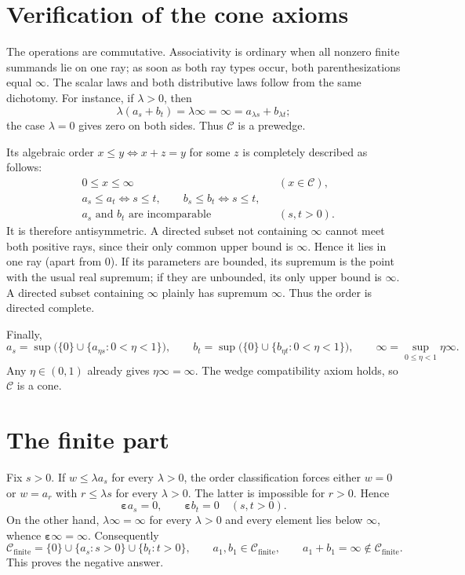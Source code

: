 \documentclass[11pt]{article}
\newcommand{\C}{\mathcal C}
\newcommand{\Fin}{\mathcal C_{\mathrm{finite}}}
\newcommand{\epsp}{\boldsymbol\varepsilon}
\newcommand{\topel}{\boldsymbol\infty}
\begin{document}
\section{Verification of the cone axioms}

The operations are commutative.  Associativity is ordinary when all
nonzero finite summands lie on one ray; as soon as both ray types occur,
both parenthesizations equal $\topel$.  The scalar laws and both
distributive laws follow from the same dichotomy.  For instance, if
$\lambda>0$, then
\[
 \lambda(a_s+b_t)=\lambda\topel=\topel
 =a_{\lambda s}+b_{\lambda t};
\]
the case $\lambda=0$ gives zero on both sides.  Thus $\C$ is a prewedge.

Its algebraic order $x\leq y\iff x+z=y$ for some $z$ is completely
described as follows:
\begin{align*}
 &0\leq x\leq\topel &&(x\in\C),\\
 &a_s\leq a_t\iff s\leq t,\qquad
   b_s\leq b_t\iff s\leq t,\\
 &a_s\text{ and }b_t\text{ are incomparable} &&(s,t>0).
\end{align*}
It is therefore antisymmetric.  A directed subset not containing
$\topel$ cannot meet both positive rays, since their only common upper bound
is $\topel$.  Hence it lies in one ray (apart from $0$).  If its parameters
are bounded, its supremum is the point with the usual real supremum; if they
are unbounded, its only upper bound is $\topel$.  A directed subset
containing $\topel$ plainly has supremum $\topel$.  Thus the order is
directed complete.

Finally,
\[
 a_s=\sup\bigl(\{0\}\cup\{a_{\eta s}:0<\eta<1\}\bigr),\qquad
 b_t=\sup\bigl(\{0\}\cup\{b_{\eta t}:0<\eta<1\}\bigr),
 \qquad \topel=\sup_{0\leq\eta<1}\eta\topel.
\]
Any $\eta\in(0,1)$ already gives $\eta\topel=\topel$.  The wedge
compatibility axiom holds, so $\C$ is a cone.

\section{The finite part}

Fix $s>0$.  If $w\leq\lambda a_s$ for every $\lambda>0$, the order
classification forces either $w=0$ or $w=a_r$ with
$r\leq\lambda s$ for every $\lambda>0$.  The latter is impossible for
$r>0$.  Hence
\[
 \epsp a_s=0,\qquad \epsp b_t=0\quad(s,t>0).
\]
On the other hand, $\lambda\topel=\topel$ for every $\lambda>0$ and every
element lies below $\topel$, whence $\epsp\topel=\topel$.  Consequently
\[
 \Fin=\{0\}\cup\{a_s:s>0\}\cup\{b_t:t>0\},
 \qquad a_1,b_1\in\Fin,\qquad a_1+b_1=\topel\notin\Fin.
\]
This proves the negative answer.
\end{document}
